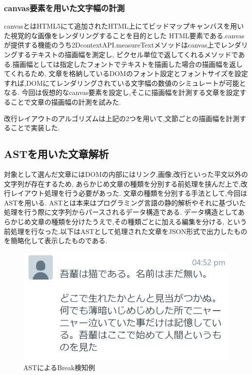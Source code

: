 \subsubsection{canvas要素を用いた文字幅の計測}
canvasとはHTML5にて追加されたHTML上にてビッドマップキャンバスを用いた視覚的な画像をレンダリングすることを目的とした
HTML要素である.canvasが提供する機能のうち2DcontextAPI.measureTextメソッドはcanvas上でレンダリングするテキストの描画幅を測定し,
ピクセル単位で返してくれるメソッドである.描画幅としては指定したフォントでテキストを描画した場合の描画幅を返してくれるため,
文章を格納しているDOMのフォント設定とフォントサイズを設定すれば,DOMにてレンダリングされている文字幅の数値のシミュレートが可能となる.
今回は仮想的なcanvas要素を設定し,そこに描画幅を計測する文章を設定することで文章の描画幅の計測を試みた.

改行レイアウトのアルゴリズムは上記の2つを用いて,文節ごとの描画幅を計測することで実装した.

\subsection{ASTを用いた文章解析}
対象として選んだ文章にはDOMの内部にはリンク,画像,改行といった平文以外の文字列が存在するため,
あらかじめ文章の種類を分別する前処理を挟んだ上で,改行レイアウト処理を行う必要があった.
文章の種類を分別する手法として,今回はAST\footnotemark[4]を用いる.
ASTとは本来はプログラミング言語の静的解析やそれに基づいた処理を行う際に文字列からパースされるデータ構造である.
データ構造としてあらかじめ文章の種類を分けたうえで,その種類ごとに加える編集を分ける,
という前処理を行なった.以下はASTとして処理された文章をJSON形式で出力したものを簡略化して表示したものである.


\newpage
\begin{figure}[H]
    \centering
    \label{fig:ASTofBreak}
    \includegraphics[width=0.6\columnwidth]{image/03/breakAST.png}
	\caption[ASTによるBreak検知例]{ASTによるBreak検知例}
\end{figure}

